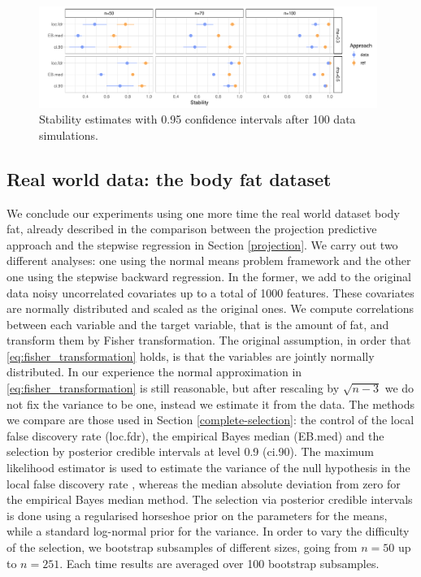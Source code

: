 \documentclass[american,]{article}
\theoremstyle{definition}
\begin{document}
\begin{figure}[tp]
  \centering
  \includegraphics[width=0.98\textwidth]{graphics/stability.pdf}
  \caption{Stability estimates with 0.95 confidence intervals after 100 data simulations.\\}
  \label{fig:stability}
\end{figure}




\hypertarget{real-world-data}{%
\subsection{Real world data: the body fat dataset}\label{real-world-data}}

We conclude our experiments using one more time the real world dataset body fat, already described in the comparison between the projection predictive approach and the stepwise regression in Section \ref{projection}. We carry out two different analyses: one using the normal means problem framework and the other one using the stepwise backward regression. In the former, we add to the original data noisy uncorrelated covariates up to a total of 1000 features. These covariates are normally distributed and scaled as the original ones. We compute correlations between each variable and the target variable, that is the amount of fat, and transform them by Fisher transformation. The original assumption, in order that \eqref{eq:fisher_transformation} holds, is that the variables are jointly normally distributed. In our experience the normal approximation in \eqref{eq:fisher_transformation} is still reasonable, but after rescaling by $\sqrt{n-3}$ we do not fix the variance to be one, instead we estimate it from the data. The methods we compare are those used in Section \ref{complete-selection}: the control of the local false discovery rate (loc.fdr), the empirical Bayes median (EB.med) and the selection by posterior credible intervals at level 0.9 (ci.90). The maximum likelihood estimator is used to estimate the variance of the null hypothesis in the local false discovery rate \cite[see][Chap. 6]{efron2012large}, whereas the median absolute deviation from zero for the empirical Bayes median method. The selection via posterior credible intervals is done using a regularised horseshoe prior on the parameters for the means, while a standard log-normal  prior for the variance. In order to vary the difficulty of the selection, we bootstrap subsamples of different sizes, going from $n=50$ up to $n=251$. Each time results are averaged over 100 bootstrap subsamples.
\end{document}
